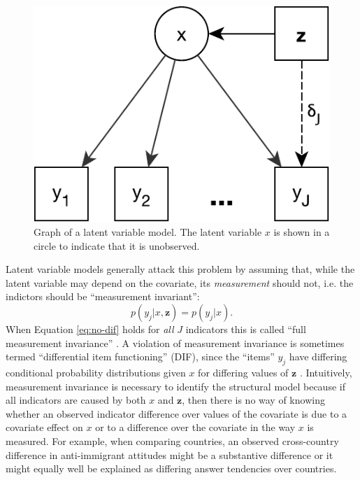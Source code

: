 \documentclass[letterpaper,12pt]{article}
\begin{document}
\begin{figure}\centering
	\includegraphics[width=.4\textwidth]{figures/LVM}
	\caption{Graph of a latent variable model. The latent variable $x$ is shown in a circle to indicate that it is unobserved. }
	\label{fig:LVM}
\end{figure}

Latent variable models generally attack this problem by assuming that, while the latent variable may depend on the covariate, its \emph{measurement} should not, i.e. the indictors should be ``measurement invariant'':
\begin{equation}
	p(y_j | x, \mathbf{z}) = p(y_j | x).
	\label{eq:no-dif}
\end{equation}
When Equation \ref{eq:no-dif} holds for \emph{all} $J$ indicators this is called ``full measurement invariance'' \citep{meredith1993measurement}. 
A violation of  measurement invariance is sometimes termed ``differential item functioning'' (DIF), since the ``items'' $y_j$ have differing conditional probability distributions given $x$ for differing values of $\mathbf{z}$ \citep{mellenbergh1989item}.
Intuitively, measurement invariance is necessary to identify the structural model  because if all indicators are caused by both $x$ and $\mathbf{z}$, then there is no way of knowing whether an observed indicator difference  over values of the covariate is due to a covariate effect on  $x$ or to a difference over the covariate in the way $x$ is measured. For example, when comparing countries, an observed cross-country difference in anti-immigrant attitudes might be a substantive difference or it might equally well be explained as differing answer tendencies over countries. 
\end{document}
